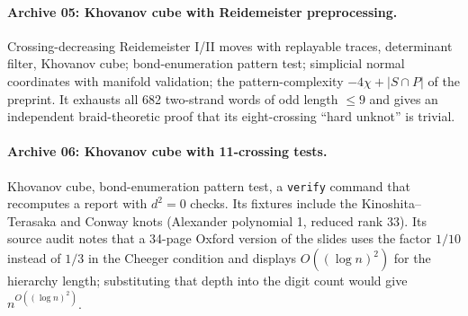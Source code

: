 \documentclass[11pt]{article}
\theoremstyle{remark}
\newcommand{\code}[1]{\texttt{#1}}
\begin{document}
\paragraph{Archive 05: Khovanov cube with Reidemeister preprocessing.}
Crossing-decreasing Reidemeister I/II moves with replayable traces,
determinant filter, Khovanov cube; bond-enumeration pattern test;
simplicial normal coordinates with manifold validation; the
pattern-complexity $-4\chi+|S\cap P|$ of the preprint. It exhausts all 682
two-strand words of odd length $\le9$ and gives an independent braid-theoretic
proof that its eight-crossing ``hard unknot'' is trivial.

\paragraph{Archive 06: Khovanov cube with 11-crossing tests.}
Khovanov cube, bond-enumeration pattern test, a \code{verify} command that
recomputes a report with $d^2=0$ checks. Its fixtures include the
Kinoshita--Terasaka and Conway knots (Alexander polynomial 1, reduced rank
33). Its source audit notes that a 34-page Oxford version of the slides uses
the factor $1/10$ instead of $1/3$ in the Cheeger condition and displays
$O((\log n)^2)$ for the hierarchy length; substituting that depth into the
digit count would give $n^{O((\log n)^2)}$.
\end{document}
